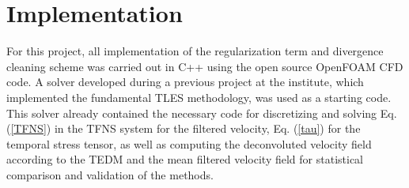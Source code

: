 \chapter{Implementation}


For this project, all implementation of the regularization term and divergence cleaning scheme was carried out in C++ using the open source OpenFOAM CFD code. A solver developed during a previous project at the institute, which implemented the fundamental TLES methodology, was used as a starting code. This solver already contained the necessary code for discretizing and solving Eq. (\ref{TFNS}) in the TFNS system for the filtered velocity, Eq. (\ref{tau}) for the temporal stress tensor, as well as computing the deconvoluted velocity field according to the TEDM and the mean filtered velocity field for statistical comparison and validation of the methods.